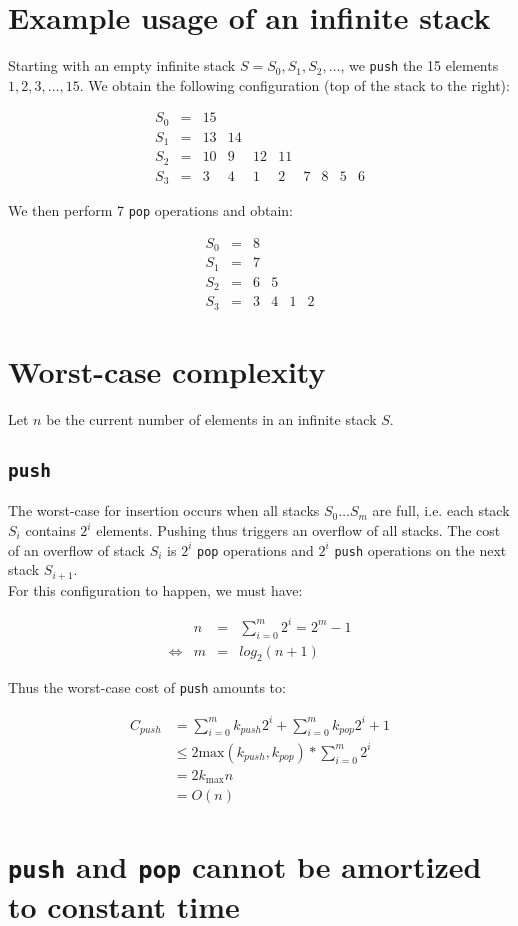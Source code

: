 \section{Example usage of an infinite stack}
Starting with an empty infinite stack $S = S_0, S_1, S_2, \ldots$, we \texttt{push} the 15 elements $1, 2, 3,\ldots, 15$. We obtain the following configuration (top of the stack to the right):

\[
\begin{array}{lcccccccccc}
  S_0 & = & 15\\
  S_1 & = & 13 & 14\\
  S_2 & = & 10 & 9 & 12 & 11\\
  S_3 & = & 3 & 4 & 1 & 2 & 7 & 8 & 5 & 6
\end{array}
\]

We then perform 7 \texttt{pop} operations and obtain:

\[
\begin{array}{lcccccccccc}
  S_0 & = & 8\\
  S_1 & = & 7\\
  S_2 & = & 6 & 5 &\\
  S_3 & = & 3 & 4 & 1 & 2
\end{array}
\]

\section{Worst-case complexity}
Let $n$ be the current number of elements in an infinite stack $S$.

  \subsection{\texttt{push}}
  The worst-case for insertion occurs when all stacks $S_0\ldots S_m$ are full, i.e. each stack $S_i$ contains $2^i$ elements. Pushing thus triggers an overflow of all stacks. The cost of an overflow of stack $S_i$ is $2^i$ \texttt{pop} operations and $2^i$ \texttt{push} operations on the next stack $S_{i+1}$.\\
  For this configuration to happen, we must have:

  \[
  \begin{array}{lccl}
    & n & = & \sum_{i=0}^m 2^i = 2^m - 1\\
    \iff & m & = & log_2(n + 1)
  \end{array}
  \]

  Thus the worst-case cost of \texttt{push} amounts to:

  \[
  \begin{array}{ll}
    C_{push} & = \sum_{i=0}^m k_{push} 2^i + \sum_{i=0}^m k_{pop} 2^i + 1\\
             & \leq 2 \text{max}(k_{push}, k_{pop}) * \sum_{i=0}^m 2^i\\
             & = 2 k_{\text{max}} n\\
             & = O(n)
  \end{array}
  \]


\section{\texttt{push} and \texttt{pop} cannot be amortized to constant time}

